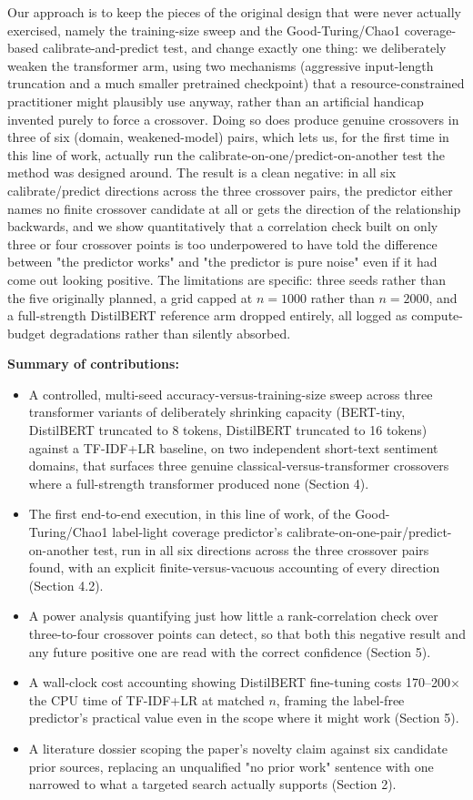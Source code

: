 \documentclass[11pt,letterpaper]{article}
\begin{document}
Our approach is to keep the pieces of the original design that were never actually exercised, namely the training-size sweep and the Good-Turing/Chao1 coverage-based calibrate-and-predict test, and change exactly one thing: we deliberately weaken the transformer arm, using two mechanisms (aggressive input-length truncation and a much smaller pretrained checkpoint) that a resource-constrained practitioner might plausibly use anyway, rather than an artificial handicap invented purely to force a crossover. Doing so does produce genuine crossovers in three of six (domain, weakened-model) pairs, which lets us, for the first time in this line of work, actually run the calibrate-on-one/predict-on-another test the method was designed around. The result is a clean negative: in all six calibrate/predict directions across the three crossover pairs, the predictor either names no finite crossover candidate at all or gets the direction of the relationship backwards, and we show quantitatively that a correlation check built on only three or four crossover points is too underpowered to have told the difference between "the predictor works" and "the predictor is pure noise" even if it had come out looking positive. The limitations are specific: three seeds rather than the five originally planned, a grid capped at $n{=}1000$ rather than $n{=}2000$, and a full-strength DistilBERT reference arm dropped entirely, all logged as compute-budget degradations rather than silently absorbed.

\textbf{Summary of contributions:}
\begin{itemize}
  \item A controlled, multi-seed accuracy-versus-training-size sweep across three transformer variants of deliberately shrinking capacity (BERT-tiny, DistilBERT truncated to 8 tokens, DistilBERT truncated to 16 tokens) against a TF-IDF+LR baseline, on two independent short-text sentiment domains, that surfaces three genuine classical-versus-transformer crossovers where a full-strength transformer produced none (Section 4).
  \item The first end-to-end execution, in this line of work, of the Good-Turing/Chao1 label-light coverage predictor's calibrate-on-one-pair/predict-on-another test, run in all six directions across the three crossover pairs found, with an explicit finite-versus-vacuous accounting of every direction (Section 4.2).
  \item A power analysis quantifying just how little a rank-correlation check over three-to-four crossover points can detect, so that both this negative result and any future positive one are read with the correct confidence (Section 5).
  \item A wall-clock cost accounting showing DistilBERT fine-tuning costs 170--200$\times$ the CPU time of TF-IDF+LR at matched $n$, framing the label-free predictor's practical value even in the scope where it might work (Section 5).
  \item A literature dossier scoping the paper's novelty claim against six candidate prior sources, replacing an unqualified "no prior work" sentence with one narrowed to what a targeted search actually supports (Section 2).
\end{itemize}
\end{document}
